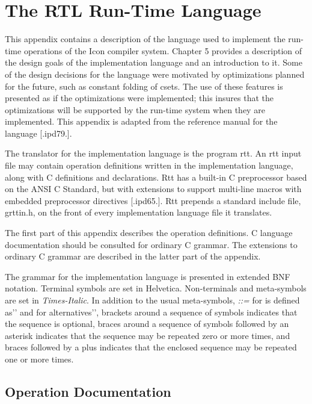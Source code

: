 \chapter{The RTL Run-Time Language }

This appendix contains a description of the language used to implement
the run-time operations of the Icon compiler system. Chapter 5
provides a description of the design goals of the implementation
language and an introduction to it.  Some of the design decisions for
the language were motivated by optimizations planned for the future,
such as constant folding of csets. The use of these features is
presented as if the optimizations were implemented; this insures that
the optimizations will be supported by the run-time system when they
are implemented. This appendix is adapted from the reference manual
for the language [.ipd79.].

The translator for the implementation language is the program rtt. An
rtt input file may contain operation definitions written in the
implementation language, along with C definitions and
declarations. Rtt has a built-in C preprocessor based on the ANSI C
Standard, but with extensions to support multi-line macros with
embedded preprocessor directives [.ipd65.]. Rtt prepends a standard
include file, grttin.h, on the front of every implementation language
file it translates.

The first part of this appendix describes the operation definitions. C
language documentation should be consulted for ordinary C grammar. The
extensions to ordinary C grammar are described in the latter part of
the appendix.

The grammar for the implementation language is presented in extended
BNF notation. Terminal symbols are set in Helvetica. Non-terminals and
meta-symbols are set in \textit{Times-Italic}. In addition to the
usual meta-symbols, \textit{::=} for
{\textasciigrave}{\textasciigrave}is defined as'{}' and
\textit{{\textbar}} for
{\textasciigrave}{\textasciigrave}alternatives'{}', brackets around a
sequence of symbols indicates that the sequence is optional, braces
around a sequence of symbols followed by an asterisk indicates that
the sequence may be repeated zero or more times, and braces followed
by a plus indicates that the enclosed sequence may be repeated one or
more times.

\section{Operation Documentation }

